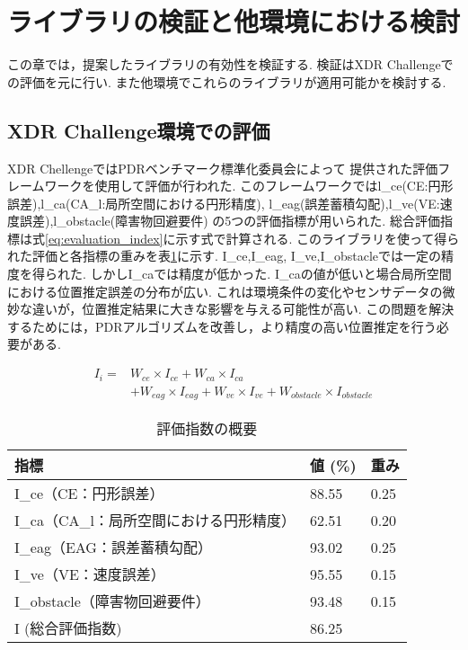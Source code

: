 
\section{ライブラリの検証と他環境における検討}
この章では，提案したライブラリの有効性を検証する.
検証はXDR Challengeでの評価を元に行い.
また他環境でこれらのライブラリが適用可能かを検討する.

\subsection{XDR Challenge環境での評価}
XDR ChellengeではPDRベンチマーク標準化委員会によって
提供された評価フレームワークを使用して評価が行われた.
このフレームワークではl\_ce(CE:円形誤差),l\_ca(CA\_l:局所空間における円形精度),
l\_eag(誤差蓄積勾配),l\_ve(VE:速度誤差),l\_obstacle(障害物回避要件)
の5つの評価指標が用いられた.
総合評価指標は式\ref{eq:evaluation_index}に示す式で計算される.
このライブラリを使って得られた評価と各指標の重みを表\ref{table:evaluation_index}に示す.
I\_ce,I\_eag, I\_ve,I\_obstacleでは一定の精度を得られた.
しかしI\_caでは精度が低かった.
I\_caの値が低いと場合局所空間における位置推定誤差の分布が広い.
これは環境条件の変化やセンサデータの微妙な違いが，位置推定結果に大きな影響を与える可能性が高い.
この問題を解決するためには，PDRアルゴリズムを改善し，より精度の高い位置推定を行う必要がある.

\begin{equation}
	\begin{aligned}
		I_i = & W_{ce} \times I_{ce} + W_{ca} \times I_{ca}                                        \\
		      & + W_{eag} \times I_{eag} + W_{ve} \times I_{ve} + W_{obstacle} \times I_{obstacle}
	\end{aligned}
	\label{eq:evaluation_index}
\end{equation}

\begin{table}[ht]
	\centering
	\begin{tabular}{l|l|l}
		\hline
		指標                        & 値 (\%) & 重み   \\ \hline
		I\_ce（CE：円形誤差）            & 88.55  & 0.25 \\
		I\_ca（CA\_l：局所空間における円形精度） & 62.51  & 0.20 \\
		I\_eag（EAG：誤差蓄積勾配）        & 93.02  & 0.25 \\
		I\_ve（VE：速度誤差）            & 95.55  & 0.15 \\
		I\_obstacle（障害物回避要件）      & 93.48  & 0.15 \\
		I (総合評価指数)                & 86.25  &      \\ \hline
	\end{tabular}
	\caption{評価指数の概要}
	\label{table:evaluation_index}
\end{table}




